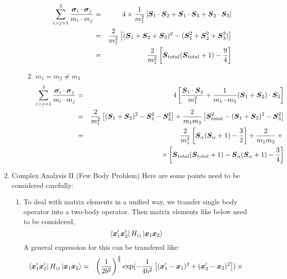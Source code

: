 \documentclass[11pt]{article}
\newcommand{\bm}[1]{\mbox{\boldmath{$#1$}}}
\begin{document}
\begin{enumerate}
\begin{enumerate}
\begin{enumerate}
\begin{eqnarray}
\sum\limits_{i>j=1}^{3}\frac{\bm{\sigma}_i\cdot\bm{\sigma}_j}{m_i\cdot{}m_j}&=&4\times\frac{1}{m_{1}^2}\left[\bm{S}_1\cdot\bm{S}_2+
\bm{S}_1\cdot\bm{S}_3+\bm{S}_2\cdot\bm{S}_3\right]\nonumber\\
&=&\frac{2}{m_{1}^2}\left[(\bm{S}_{1}+\bm{S}_{2}+\bm{S}_{3})^2-(\bm{S}_{1}^2+\bm{S}_{2}^2+\bm{S}_{3}^2)\right]\nonumber\\
&=&\frac{2}{m_{1}^2}\left[\bm{S}_{total}(\bm{S}_{total}+1)-\frac{9}{4}\right]
\end{eqnarray}
\item $m_1=m_2\neq{}m_3$
\begin{eqnarray}
\sum\limits_{i>j=1}^{3}\frac{\bm{\sigma}_i\cdot\bm{\sigma}_j}{m_i\cdot{}m_j}&=&4\left[\frac{\bm{S}_1\cdot\bm{S}_2}
{m_{1}^2}+\frac{1}{m_1\cdot{}m_3}
(\bm{S}_1+\bm{S}_2)\cdot\bm{S}_3\right]\nonumber\\
&=&\frac{2}{m_{1}^2}\left[(\bm{S}_{1}+\bm{S}_{2})^2-\bm{S}_{1}^2-\bm{S}_{2}^2\right]+\frac{2}{m_1{}m_3}
\left[\bm{S}_{total}^2-(\bm{S}_{1}+\bm{S}_{2})^2-\bm{S}_{3}^2\right]\nonumber\\
&=&\frac{2}{m_{1}^2}\left[\bm{S}_{\alpha}(\bm{S}_{\alpha}+1)-\frac{3}{2}\right]+\frac{2}{m_1{}m_3}\times{}
\nonumber\\
&&{}\times\left[\bm{S}_{total}(\bm{S}_{total}+1)-{}
\bm{S}_{\alpha}(\bm{S}_{\alpha}+1)-\frac{3}{4}\right]
\end{eqnarray}
\end{enumerate}
\end{enumerate}
\item Complex Analysis II (Few Body Problem)
\label{sec-1-1-1-3}
Here are some points need to be considered carefully:
\begin{enumerate}
\item To deal with matrix elements in a unified way, we transfer single body operator into a two-body operator.
Then matrix elements like below need to be considered,
\begin{equation}
\bra{\bm{x}_{1}^\prime\bm{x}_{2}^\prime}H_{i j}\ket{\bm{x}_{1}\bm{x}_{2}}
\end{equation}
A general expression for this can be transfered like:
\begin{eqnarray}
\bra{\bm{x}_{1}^\prime\bm{x}_{2}^\prime}H_{i j}\ket{\bm{x}_{1}\bm{x}_{2}}&=&
\left(\frac{1}{2b^2}\right)^{\frac{3}{2}}\rm{exp}(-\frac{1}{4b^2}\left[(\bm{x}_{1}^\prime-\bm{x}_{1})^2
+(\bm{x}_{2}^\prime-\bm{x}_{2})^2\right])\times{}\nonumber\\

\end{eqnarray}
\end{enumerate}
\end{enumerate}
\end{document}
